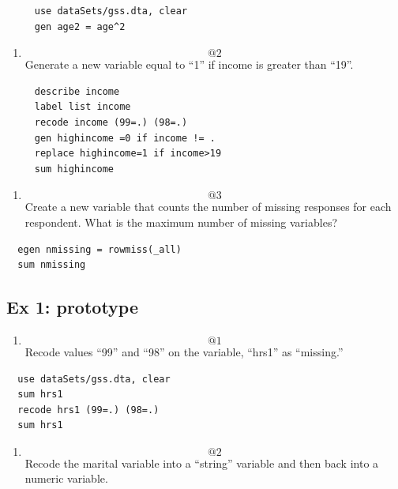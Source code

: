 \documentclass[]{book}
\providecommand{\tightlist}{%
  \setlength{\itemsep}{0pt}\setlength{\parskip}{0pt}}
\begin{document}
\begin{verbatim}
     use dataSets/gss.dta, clear
     gen age2 = age^2
\end{verbatim}

\begin{enumerate}
\def\labelenumi{\arabic{enumi}.}
\setcounter{enumi}{1}
\tightlist
\item
  \[@2\] Generate a new variable equal to ``1'' if income is greater
  than ``19''.
\end{enumerate}

\begin{verbatim}
     describe income
     label list income
     recode income (99=.) (98=.)
     gen highincome =0 if income != .
     replace highincome=1 if income>19
     sum highincome
\end{verbatim}

\begin{enumerate}
\def\labelenumi{\arabic{enumi}.}
\setcounter{enumi}{2}
\tightlist
\item
  \[@3\]Create a new variable that counts the number of missing
  responses for each respondent. What is the maximum number of missing
  variables?
\end{enumerate}

\begin{verbatim}
  egen nmissing = rowmiss(_all)
  sum nmissing
\end{verbatim}

\subsection{Ex 1: prototype}\label{ex-1-prototype-4}

\begin{enumerate}
\def\labelenumi{\arabic{enumi}.}
\tightlist
\item
  \[@1\] Recode values ``99'' and ``98'' on the variable, ``hrs1'' as
  ``missing.''
\end{enumerate}

\begin{verbatim}
  use dataSets/gss.dta, clear
  sum hrs1
  recode hrs1 (99=.) (98=.) 
  sum hrs1
\end{verbatim}

\begin{enumerate}
\def\labelenumi{\arabic{enumi}.}
\setcounter{enumi}{1}
\tightlist
\item
  \[@2\] Recode the marital variable into a ``string'' variable and then
  back into a numeric variable.
\end{enumerate}
\end{document}
